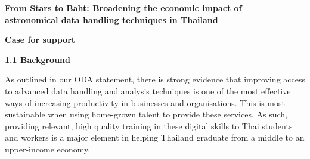 \documentclass[11pt]{article}
\begin{document}
  \setcounter{figure}{0}
  \noindent
  {\LARGE \bf From Stars to Baht: Broadening the economic impact of \\
  astronomical data handling techniques in Thailand}
  
  \vspace{3mm}
  \noindent
  {\LARGE \bf Case for support}
  
  
  \vspace{2mm}
  \noindent
  {\large \bf 1.1 Background}
  
  \noindent
  As outlined in our ODA statement, there is strong evidence that improving access to advanced data handling and analysis techniques is one of the most effective ways of increasing productivity in businesses and organisations. This is most sustainable when using home-grown talent to provide these services. As such, providing relevant, high quality training in these digital skills to Thai students and workers is a major element in helping Thailand graduate from a middle to an upper-income economy. 
\end{document}
